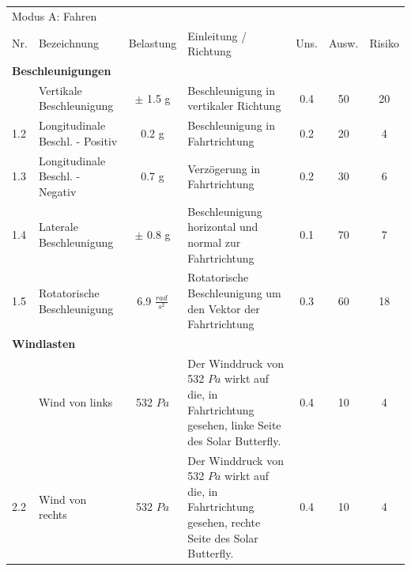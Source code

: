 \begin{landscape}%
  \centering %
  \begin{tabularx}{\linewidth}{llcXccc}
    \multicolumn{7}{l}{\LARGE{Modus A: Fahren}}\\
    \thickhline
    Nr. & Bezeichnung & Belastung & Einleitung / Richtung & Uns. & Ausw. & Risiko\\
    \hline
    \multicolumn{7}{l}{\textbf{Beschleunigungen}}\\
    \thickhline
    1.1 & Vertikale Beschleunigung         & $\pm$ 1.5 g           & Beschleunigung in vertikaler Richtung & 0.4 & 50 & 20\\
    1.2 & Longitudinale Beschl. - Positiv  & 0.2 g                 & Beschleunigung in Fahrtrichtung & 0.2 & 20 & 4\\
    1.3 & Longitudinale Beschl. - Negativ  & 0.7 g                 & Verzögerung in Fahrtrichtung & 0.2 & 30 & 6\\
    1.4 & Laterale Beschleunigung          & $\pm$ 0.8 g           & Beschleunigung horizontal und normal zur Fahrtrichtung & 0.1 & 70 & 7\\
    1.5 & Rotatorische Beschleunigung      & 6.9 $\frac{rad}{s^2}$ & Rotatorische Beschleunigung um den Vektor der Fahrtrichtung & 0.3 & 60 & 18\\

    \multicolumn{7}{l}{\textbf{Windlasten}}\\
    \thickhline
    2.1 & Wind von links & 532 $Pa$ & Der Winddruck von 532 $Pa$ wirkt auf die, in Fahrtrichtung gesehen, linke Seite des Solar Butterfly. %
    & 0.4 & 10 & 4\\
    2.2 & Wind von rechts & 532 $Pa$ & Der Winddruck von 532 $Pa$ wirkt auf die, in Fahrtrichtung gesehen, rechte Seite des Solar Butterfly. %
    & 0.4 & 10 & 4\\


\end{tabularx}
\end{landscape}

